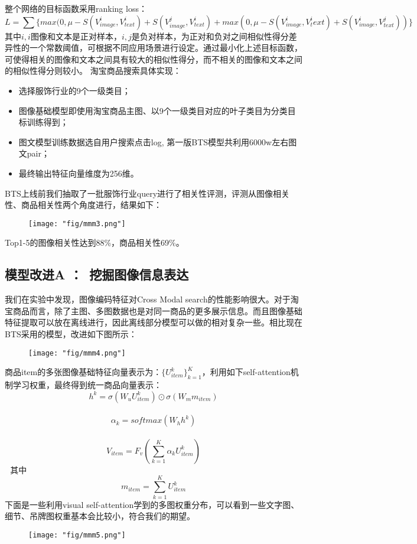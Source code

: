 整个网络的目标函数采用ranking loss：
 $$L=\sum\{ max(0,  \mu - S(V^i_{image}, V^i_{text}) + S(V^j_{image}, V^i_{text}) + max(0, \mu - S(V^i_{image}, V^i_text) + S(V^i_{image}, V^j_{text})) \}$$
其中${i,i}$图像和文本是正对样本，${i,j}$是负对样本，为正对和负对之间相似性得分差异性的一个常数阈值，可根据不同应用场景进行设定。通过最小化上述目标函数，可使得相关的图像和文本之间具有较大的相似性得分，而不相关的图像和文本之间的相似性得分则较小。
淘宝商品搜索具体实现：
\begin{itemize}
\item 选择服饰行业的9个一级类目；
\item 图像基础模型即使用淘宝商品主图、以9个一级类目对应的叶子类目为分类目标训练得到；
\item 图文模型训练数据选自用户搜索点击log, 第一版BTS模型共利用6000w左右图文pair；
\item 最终输出特征向量维度为256维。
\end{itemize}
BTS上线前我们抽取了一批服饰行业query进行了相关性评测，评测从图像相关性、商品相关性两个角度进行，结果如下： 
\begin{figure}[!h]
	\centering
	\texttt{[image: "fig/mmm3.png"]}
	\caption{}
	\label{fig:mmm3}
\end{figure}
Top1-5的图像相关性达到88\%，商品相关性69\%。

\subsection{模型改进A ： 挖掘图像信息表达}

我们在实验中发现，图像编码特征对Cross Modal search的性能影响很大。对于淘宝商品而言，除了主图、多图数据也是对同一商品的更多展示信息。而且图像基础特征提取可以放在离线进行，因此离线部分模型可以做的相对复杂一些。相比现在BTS采用的模型，改进如下图所示： 
\begin{figure}[!h]
	\centering
	\texttt{[image: "fig/mmm4.png"]}
	\caption{}
	\label{fig:mmm4}
\end{figure}

商品item的多张图像基础特征向量表示为：$\{ U^k_{item} \}^K_{k=1}$，利用如下self-attention机制学习权重，最终得到统一商品向量表示：  
$$h^k=\sigma(W_uU^k_{item}) \odot \sigma(W_m m_{item})$$ 
$$\alpha_k = softmax(W_hh^k)$$ 
$$V_{item} = F_v(\sum^K_{k=1}\alpha_kU^k_{item})$$ 
其中 
$$m_{item} = \sum^K_{k=1}U^k_{item}$$
下面是一些利用visual self-attention学到的多图权重分布，可以看到一些文字图、细节、吊牌图权重基本会比较小，符合我们的期望。  
\begin{figure}[!h]
	\centering
	\texttt{[image: "fig/mmm5.png"]}
	\caption{}
	\label{fig:mmm5}
\end{figure}

